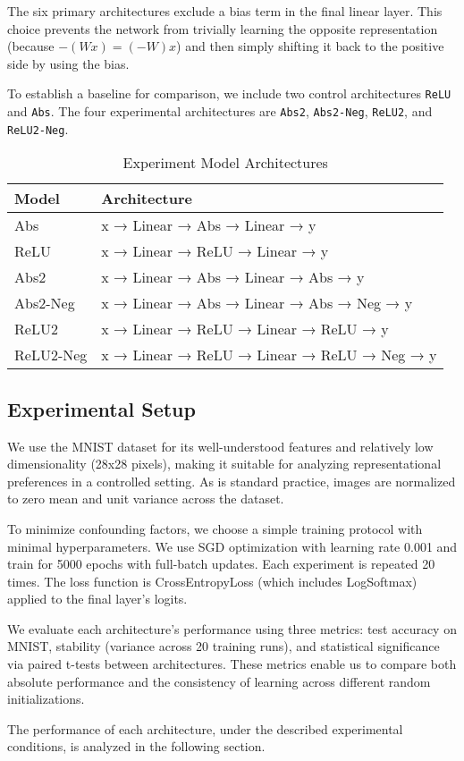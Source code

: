 The six primary architectures exclude a bias term in the final linear layer. This choice prevents the network from trivially learning the opposite representation (because $-(Wx)=(-W)x$) and then simply shifting it back to the positive side by using the bias. 

To establish a baseline for comparison, we include two control architectures \texttt{ReLU} and \texttt{Abs}. The four experimental architectures are \texttt{Abs2}, \texttt{Abs2-Neg}, \texttt{ReLU2}, and \texttt{ReLU2-Neg}. 

\begin{table}[H]
    \centering
    \footnotesize
    \begin{tabular}{ll}
        \toprule
        \textbf{Model} & \textbf{Architecture}\\
        \midrule
        Abs & x → Linear → Abs → Linear → y \\
        ReLU & x → Linear → ReLU → Linear → y \\
        \midrule
        Abs2 & x → Linear → Abs → Linear → Abs → y \\
        Abs2-Neg & x → Linear → Abs → Linear → Abs → Neg → y \\
        ReLU2 & x → Linear → ReLU → Linear → ReLU → y \\
        ReLU2-Neg & x → Linear → ReLU → Linear → ReLU → Neg → y \\
        \bottomrule
    \end{tabular}
    \caption{Experiment Model Architectures}
\end{table}

\subsection{Experimental Setup}
We use the MNIST dataset \cite{lecun1998gradient} for its well-understood features and relatively low dimensionality (28x28 pixels), making it suitable for analyzing representational preferences in a controlled setting. As is standard practice, images are normalized to zero mean and unit variance across the dataset.

To minimize confounding factors, we choose a simple training protocol with minimal hyperparameters. We use SGD optimization with learning rate 0.001 and train for 5000 epochs with full-batch updates. Each experiment is repeated 20 times. The loss function is CrossEntropyLoss (which includes LogSoftmax) applied to the final layer's logits.

We evaluate each architecture's performance using three metrics: test accuracy on MNIST, stability (variance across 20 training runs), and statistical significance via paired t-tests between architectures. These metrics enable us to compare both absolute performance and the consistency of learning across different random initializations.

The performance of each architecture, under the described experimental conditions, is analyzed in the following section. 
